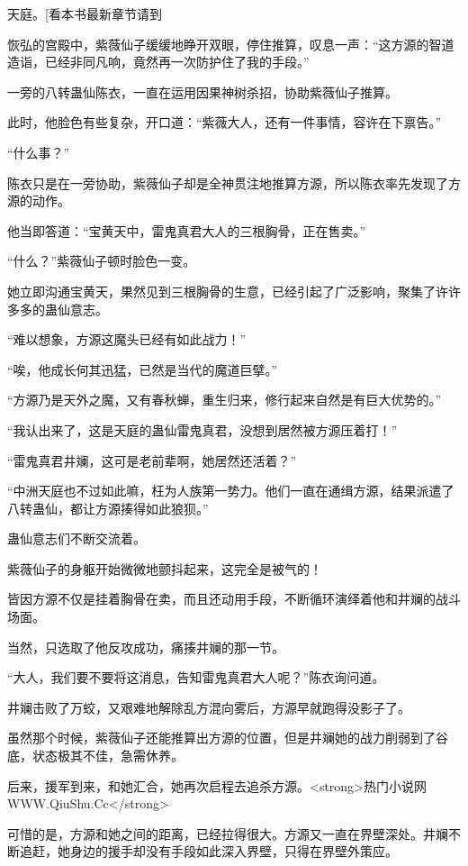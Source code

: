 
\begin{this_body}

天庭。[看本书最新章节请到

恢弘的宫殿中，紫薇仙子缓缓地睁开双眼，停住推算，叹息一声：“这方源的智道造诣，已经非同凡响，竟然再一次防护住了我的手段。”

一旁的八转蛊仙陈衣，一直在运用因果神树杀招，协助紫薇仙子推算。

此时，他脸色有些复杂，开口道：“紫薇大人，还有一件事情，容许在下禀告。”

“什么事？”

陈衣只是在一旁协助，紫薇仙子却是全神贯注地推算方源，所以陈衣率先发现了方源的动作。

他当即答道：“宝黄天中，雷鬼真君大人的三根胸骨，正在售卖。”

“什么？”紫薇仙子顿时脸色一变。

她立即沟通宝黄天，果然见到三根胸骨的生意，已经引起了广泛影响，聚集了许许多多的蛊仙意志。

“难以想象，方源这魔头已经有如此战力！”

“唉，他成长何其迅猛，已然是当代的魔道巨擘。”

“方源乃是天外之魔，又有春秋蝉，重生归来，修行起来自然是有巨大优势的。”

“我认出来了，这是天庭的蛊仙雷鬼真君，没想到居然被方源压着打！”

“雷鬼真君井斓，这可是老前辈啊，她居然还活着？”

“中洲天庭也不过如此嘛，枉为人族第一势力。他们一直在通缉方源，结果派遣了八转蛊仙，都让方源揍得如此狼狈。”

蛊仙意志们不断交流着。

紫薇仙子的身躯开始微微地颤抖起来，这完全是被气的！

皆因方源不仅是挂着胸骨在卖，而且还动用手段，不断循环演绎着他和井斓的战斗场面。

当然，只选取了他反攻成功，痛揍井斓的那一节。

“大人，我们要不要将这消息，告知雷鬼真君大人呢？”陈衣询问道。

井斓击败了万蛟，又艰难地解除乱方混向雾后，方源早就跑得没影子了。

虽然那个时候，紫薇仙子还能推算出方源的位置，但是井斓她的战力削弱到了谷底，状态极其不佳，急需休养。

后来，援军到来，和她汇合，她再次启程去追杀方源。<strong>热门小说网WWW.QiuShu.Cc</strong>

可惜的是，方源和她之间的距离，已经拉得很大。方源又一直在界壁深处。井斓不断追赶，她身边的援手却没有手段如此深入界壁，只得在界壁外策应。


\end{this_body}
